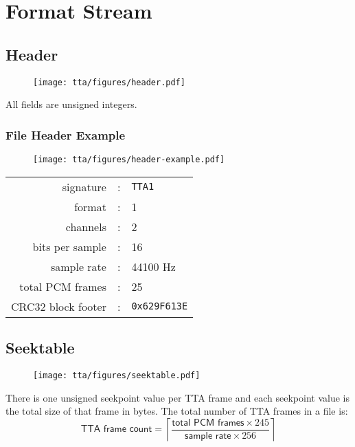 
\section{Format Stream}
\subsection{Header}
\begin{figure}[h]
  \texttt{[image: tta/figures/header.pdf]}
\end{figure}
\par
\noindent
All fields are unsigned integers.

\subsubsection{File Header Example}
\begin{figure}[h]
  \texttt{[image: tta/figures/header-example.pdf]}
\end{figure}
\begin{table}[h]
  \begin{tabular}{rcl}
    \textsf{signature} & : & \texttt{TTA1} \\
    \textsf{format} & : & 1 \\
    \textsf{channels} & : & 2 \\
    \textsf{bits per sample} & : & 16 \\
    \textsf{sample rate} & : & 44100 Hz \\
    \textsf{total PCM frames} & : & 25 \\
    \textsf{CRC32 block footer} & : & \texttt{0x629F613E} \\
  \end{tabular}
\end{table}

\clearpage

\subsection{Seektable}
\begin{figure}[h]
  \texttt{[image: tta/figures/seektable.pdf]}
\end{figure}
\par
\noindent
There is one unsigned seekpoint value per TTA frame
and each seekpoint value is the total size of that frame in bytes.
The total number of TTA frames in a file is:
\begin{equation*}
\textsf{TTA frame count} = \left\lceil\frac{\textsf{total PCM frames} \times 245}{\textsf{sample rate} \times 256}\right\rceil
\end{equation*}
